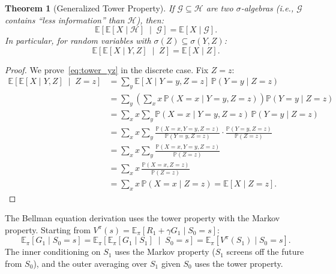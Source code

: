 \documentclass[11pt,a4paper]{article}
\theoremstyle{definition}
\theoremstyle{plain}
\newtheorem{theorem}{Theorem}[section]
\theoremstyle{remark}
\newcommand{\E}{\mathbb{E}}
\newcommand{\Prob}{\mathbb{P}}
\begin{document}
\begin{theorem}[Generalized Tower Property]
\label{thm:tower_general}
If $\mathcal{G} \subseteq \mathcal{H}$ are two $\sigma$-algebras (i.e., $\mathcal{G}$ contains ``less information'' than $\mathcal{H}$), then:
\begin{equation}
    \E\!\left[\E[X \mid \mathcal{H}] \;\middle|\; \mathcal{G}\right] = \E[X \mid \mathcal{G}].
    \label{eq:tower_general}
\end{equation}
In particular, for random variables with $\sigma(Z) \subseteq \sigma(Y, Z)$:
\begin{equation}
    \E\!\left[\E[X \mid Y, Z] \;\middle|\; Z\right] = \E[X \mid Z].
    \label{eq:tower_yz}
\end{equation}
\end{theorem}

\begin{proof}
We prove~\eqref{eq:tower_yz} in the discrete case. Fix $Z = z$:
\begin{align}
    \E\!\left[\E[X \mid Y, Z] \;\middle|\; Z = z\right]
    &= \sum_y \E[X \mid Y = y, Z = z]\, \Prob(Y = y \mid Z = z) \nonumber\\
    &= \sum_y \left(\sum_x x\, \Prob(X = x \mid Y = y, Z = z)\right) \Prob(Y = y \mid Z = z) \nonumber\\
    &= \sum_x x \sum_y \Prob(X = x \mid Y = y, Z = z)\, \Prob(Y = y \mid Z = z) \nonumber\\
    &= \sum_x x \sum_y \frac{\Prob(X = x, Y = y, Z = z)}{\Prob(Y = y, Z = z)} \cdot \frac{\Prob(Y = y, Z = z)}{\Prob(Z = z)} \nonumber\\
    &= \sum_x x \sum_y \frac{\Prob(X = x, Y = y, Z = z)}{\Prob(Z = z)} \nonumber\\
    &= \sum_x x\, \frac{\Prob(X = x, Z = z)}{\Prob(Z = z)} \nonumber\\
    &= \sum_x x\, \Prob(X = x \mid Z = z) = \E[X \mid Z = z]. \label{eq:tower_general_proof}
\end{align}
\end{proof}

\begin{tdconnection}
The Bellman equation derivation uses the tower property with the Markov property. Starting from $V^\pi(s) = \E_\pi[R_1 + \gamma G_1 \mid S_0 = s]$:
\[
    \E_\pi[G_1 \mid S_0 = s] = \E_\pi\!\left[\E_\pi[G_1 \mid S_1] \;\middle|\; S_0 = s\right] = \E_\pi[V^\pi(S_1) \mid S_0 = s].
\]
The inner conditioning on $S_1$ uses the Markov property ($S_1$ screens off the future from $S_0$), and the outer averaging over $S_1$ given $S_0$ uses the tower property.
\end{tdconnection}
\end{document}
